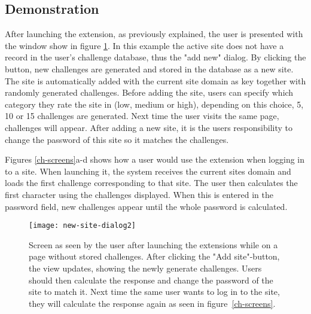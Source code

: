 

\subsection{Demonstration}\label{demo}
After launching the extension, as previously explained, the user is presented with the window show in figure \ref{launch-screen}. In this example the active site does not have a record in the user's challenge database, thus the "add new" dialog. By clicking the button, new challenges are generated and stored in the database as a new site. The site is automatically added with the current site domain as key together with randomly generated challenges. Before adding the site, users can specify which category they rate the site in (low, medium or high), depending on this choice, 5, 10 or 15 challenges are generated. Next time the user visits the same page, challenges will appear. After adding a new site, it is the users responsibility to change the password of this site so it matches the challenges.

\par Figures \ref{ch-screens}a-d shows how a user would use the extension when logging in to a site. When launching it, the system receives the current sites domain and loads the first challenge corresponding to that site. The user then calculates the first character using the challenges displayed. When this is entered in the password field, new challenges appear until the whole password is calculated. 

\begin{figure}
    \centering
    \texttt{[image: new-site-dialog2]} 
    \caption{Screen as seen by the user after launching the extensions while on a page without stored challenges. After clicking the "Add site"-button, the view updates, showing the newly generate challenges. Users should then calculate the response and change the password of the site to match it. Next time the same user wants to log in to the site, they will calculate the response again as seen in figure~\ref{ch-screens}.}
    \label{launch-screen}
\end{figure}

